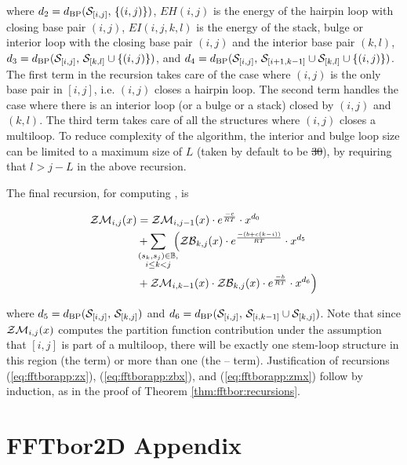\documentclass[11pt, oneside]{Thesis} %
\providecommand{\DIFadd}[1]{{\protect\color{blue}\uwave{#1}}} %
\providecommand{\DIFdel}[1]{{\protect\color{red}\sout{#1}}}                      %
\providecommand{\DIFaddbegin}{} %
\providecommand{\DIFaddend}{} %
\providecommand{\DIFdelbegin}{} %
\providecommand{\DIFdelend}{} %
\begin{document}
where $d_2 = d_{\text{BP}}(\mathcal S_{[i,j]},\,\{(i,j)\})$,
$EH(i,j)$ is the energy of the hairpin loop with closing base
pair $(i,j)$, $EI(i,j,k,l)$ is the energy of the stack, bulge or
interior loop with the closing base pair $(i,j)$ and the interior
base pair $(k,l)$, $d_3 = d_{\text{BP}}(\mathcal S_{[i,j]},\,\mathcal S_{[k,l]} \cup
\{(i,j)\})$, and $d_4 = d_{\text{BP}}(\mathcal S_{[i,j]},\,\mathcal S_{[i+1,k-1]} \cup
\mathcal S_{[k,l]} \cup\{(i,j)\})$. The first term in the
recursion takes care of the case where $(i,j)$ is the only base pair
in $[i,j]$, i.e. $(i,j)$ closes a hairpin loop. The second term
handles the case where there is an interior loop (or a bulge or a
stack) closed by $(i,j)$ and $(k,l)$. The third term takes care of
all the structures where $(i,j)$ closes a multiloop. To reduce
complexity of the algorithm, the interior and bulge loop size can be
limited to a maximum size of $L$ (taken by default to be \DIFdelbegin \DIFdel{30}\DIFdelend \DIFaddbegin \DIFadd{$30$}\DIFaddend ),
by requiring that $l>j-L$ in the above recursion.

The final recursion, for computing \emZM{}, is

\begin{align}
\label{eq:fftborapp:zmx}
\begin{split}
\emZM{i,j} &= \emZM{i,j-1} \cdot \boltzE{c} \cdot x^{d_0} \\
&+ \sum_{\mathclap{\substack{(s_k,s_j) \in \bpSet, \\ i \leq k < j }}}\enspace
\Big( \emZB{k,j} \cdot \boltzE{(b+c(k-i))} \cdot x^{d_5} \\
&+ \emZM{i,k-1} \cdot \emZB{k,j} \cdot \boltzE{b} \cdot x^{d_6} \Big)
\end{split}
\end{align}

where $d_5 = d_{\text{BP}}(\mathcal S_{[i,j]},\,\mathcal S_{[k,j]})$ and $d_6
=d_{\text{BP}}(\mathcal S_{[i,j]},\,\mathcal S_{[i,k-1]} \cup \mathcal S_{[k,j]})$.
Note that since $\mathcal{ZM}_{i,j}(x)$ computes the partition function
contribution under the assumption that $[i,j]$ is part of a
multiloop, there will be exactly one stem-loop structure in this
region (the \emZB{} term) or
more than one (the \emZM{}--\emZB{} term).
Justification of recursions (\ref{eq:fftborapp:zx}),
(\ref{eq:fftborapp:zbx}), and
(\ref{eq:fftborapp:zmx})
follow by induction, as in the proof of Theorem \ref{thm:fftbor:recursions}.


\chapter{FFTbor2D Appendix}
\label{ch:ffttwoapp}
\end{document}
